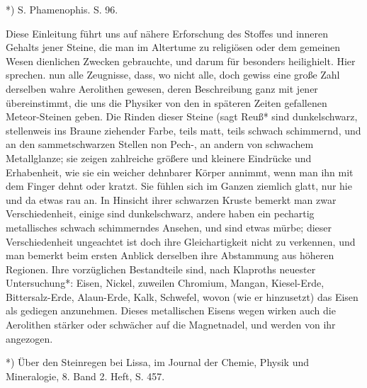 \documentclass[a4paper, 11pt, oneside, polutonikogreek, german]{article}
\begin{document}
*) S. Phamenophis. S. 96.

Diese Einleitung führt uns auf nähere Erforschung des Stoffes und inneren Gehalts jener Steine, die man im Altertume zu religiösen oder dem gemeinen Wesen dienlichen Zwecken gebrauchte, und darum für besonders heilighielt. Hier sprechen. nun alle Zeugnisse, dass, wo nicht alle, doch gewiss eine große Zahl derselben wahre Aerolithen gewesen, deren Beschreibung ganz mit jener übereinstimmt, die uns die Physiker von den in späteren Zeiten gefallenen Meteor-Steinen geben. Die Rinden dieser Steine (sagt Reuß* sind dunkelschwarz, stellenweis ins Braune ziehender Farbe, teils matt, teils schwach schimmernd, und an den sammetschwarzen Stellen non Pech-, an andern von schwachem Metallglanze; sie zeigen zahlreiche größere und kleinere Eindrücke und Erhabenheit, wie sie ein weicher dehnbarer Körper annimmt, wenn man ihn mit dem Finger dehnt oder kratzt. Sie fühlen sich im Ganzen ziemlich glatt, nur hie und da etwas rau an. In Hinsicht ihrer schwarzen Kruste bemerkt man zwar Verschiedenheit, einige sind dunkelschwarz, andere haben ein pechartig metallisches schwach schimmerndes Ansehen, und sind etwas mürbe; dieser Verschiedenheit ungeachtet ist doch ihre Gleichartigkeit nicht zu verkennen, und man bemerkt beim ersten Anblick derselben ihre Abstammung aus höheren Regionen. Ihre vorzüglichen Bestandteile sind, nach Klaproths neuester Untersuchung*: Eisen, Nickel, zuweilen Chromium, Mangan, Kiesel-Erde, Bittersalz-Erde, Alaun-Erde, Kalk, Schwefel, wovon (wie er hinzusetzt) das Eisen als gediegen anzunehmen. Dieses metallischen Eisens wegen wirken auch die Aerolithen stärker oder schwächer auf die Magnetnadel, und werden von ihr angezogen.

*) Über den Steinregen bei Lissa, im Journal der Chemie, Physik und Mineralogie, 8. Band 2. Heft, S. 457.
\end{document}
